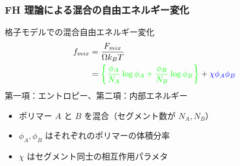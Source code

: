 \documentclass[12pt, dvipdfmx]{beamer}
\begin{document}
\begin{frame}\frametitle{FH 理論による混合の自由エネルギー変化}
	格子モデルでの混合自由エネルギー変化
	\vspace{-0.5\baselineskip}
	\begin{align*}
	f_{mix} &= \dfrac{F_{mix}}{\Omega k_B T} \notag \\
	&= \color{green}\left\{ \dfrac{\phi_A}{N_A} \log \phi_A 
	+ \dfrac{\phi_B}{N_B} \log \phi_B \right\} \color{black} 
	+ \color{blue}\chi \phi_A \phi_B \color{black}
	\end{align*}
	\color{green}第一項：エントロピー\color{black}、\color{blue}第二項：内部エネルギー\color{black}
	\begin{itemize}
	\item  ポリマー $A$ と $B$ を混合（セグメント数が $N_A, N_B$）
	\item $\phi_A, \phi_B$ はそれぞれのポリマーの体積分率
	\item $\chi$ はセグメント同士の\color{red}相互作用パラメタ\color{black}
	\end{itemize}	
\end{frame}
\end{document}
